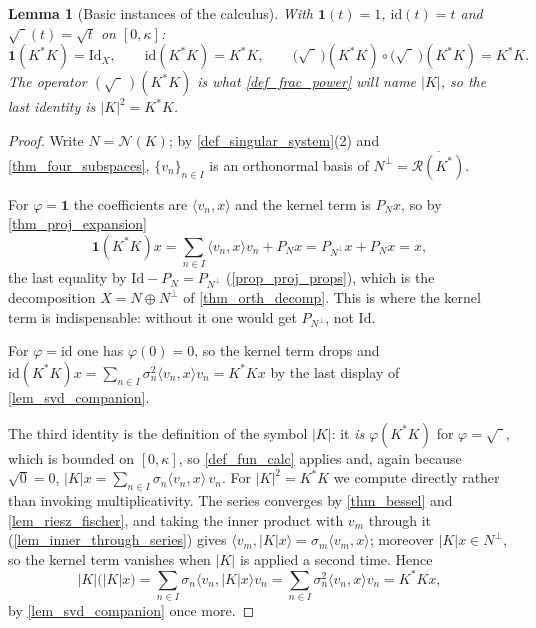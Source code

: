 \documentclass[a4paper]{report}
\theoremstyle{plain}
\newtheorem{lemma}[theorem]{Lemma}
\theoremstyle{definition}
\theoremstyle{remark}
\begin{document}
\begin{lemma}[Basic instances of the calculus]
  \label{lem_fun_calc_basic}
  With $\mathbf{1}(t) = 1$, $\mathrm{id}(t) = t$ and $\sqrt{\phantom{t}}(t) = \sqrt{t}$ on
  $[0,\kappa]$:
  \[
    \mathbf{1}(K^*K) = \mathrm{Id}_X, \qquad
    \mathrm{id}(K^*K) = K^*K, \qquad
    \bigl(\sqrt{\phantom{t}}\,\bigr)(K^*K) \circ
      \bigl(\sqrt{\phantom{t}}\,\bigr)(K^*K) = K^*K .
  \]
  The operator $(\sqrt{\phantom{t}}\,)(K^*K)$ is what \cref{def_frac_power} will name
  $|K|$, so the last identity is $|K|^2 = K^*K$.
\end{lemma}
\begin{proof}
  Write $N = \mathcal{N}(K)$; by \cref{def_singular_system}(2) and
  \cref{thm_four_subspaces}, $\{v_n\}_{n\in I}$ is an orthonormal basis of
  $N^\perp = \overline{\mathcal{R}(K^*)}$.

  For $\varphi = \mathbf{1}$ the coefficients are $\langle v_n,x\rangle$ and the kernel
  term is $P_Nx$, so by \cref{thm_proj_expansion}
  \[
    \mathbf{1}(K^*K)x = \sum_{n\in I}\langle v_n,x\rangle v_n + P_Nx
      = P_{N^\perp}x + P_Nx = x ,
  \]
  the last equality by $\mathrm{Id} - P_N = P_{N^\perp}$ (\cref{prop_proj_props}), which is
  the decomposition $X = N \oplus N^\perp$ of \cref{thm_orth_decomp}.  This is where the
  kernel term is indispensable: without it one would get $P_{N^\perp}$, not $\mathrm{Id}$.

  For $\varphi = \mathrm{id}$ one has $\varphi(0) = 0$, so the kernel term drops and
  $\mathrm{id}(K^*K)x = \sum_{n\in I}\sigma_n^2\langle v_n,x\rangle v_n = K^*Kx$ by the
  last display of \cref{lem_svd_companion}.

  The third identity is the definition of the symbol $|K|$: it \emph{is} $\varphi(K^*K)$
  for $\varphi = \sqrt{\phantom{t}}$, which is bounded on $[0,\kappa]$, so
  \cref{def_fun_calc} applies and, again because $\sqrt{0} = 0$,
  $|K|x = \sum_{n \in I}\sigma_n\langle v_n,x\rangle\,v_n$.  For $|K|^2 = K^*K$ we compute
  directly rather than invoking multiplicativity.  The series converges by
  \cref{thm_bessel} and \cref{lem_riesz_fischer}, and taking the inner product with $v_m$
  through it (\cref{lem_inner_through_series}) gives
  $\langle v_m, |K|x\rangle = \sigma_m\langle v_m,x\rangle$; moreover $|K|x \in N^\perp$,
  so the kernel term vanishes when $|K|$ is applied a second time.  Hence
  \[
    |K|\bigl(|K|x\bigr) = \sum_{n\in I}\sigma_n\langle v_n,|K|x\rangle v_n
      = \sum_{n\in I}\sigma_n^2\langle v_n,x\rangle v_n = K^*Kx ,
  \]
  by \cref{lem_svd_companion} once more.
\end{proof}
\end{document}
